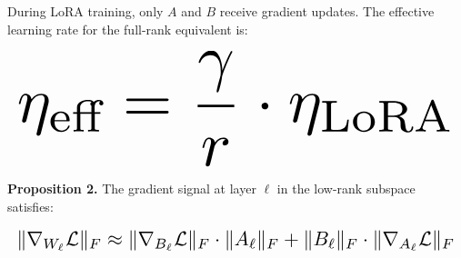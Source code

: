 \documentclass[10pt,journal,compsoc,twocolumn]{IEEEtran}
\begin{document}
During LoRA training, only $A$ and $B$ receive gradient updates. The effective learning rate for the full-rank equivalent is:

























\begin{equation}
\resizebox{\columnwidth}{!}{$\displaystyle
\begin{aligned}
\eta_{\text{eff}} = \frac{\gamma}{r} \cdot \eta_{\text{LoRA}}
\end{aligned}
$}
\end{equation}

























\textbf{Proposition 2.} The gradient signal at layer $\ell$ in the low-rank subspace satisfies:

























\begin{equation}
\resizebox{\columnwidth}{!}{$\displaystyle
\begin{aligned}
\|\nabla_{W_\ell}\mathcal{L}\|_F \approx \|\nabla_{B_\ell}\mathcal{L}\|_F \cdot \|A_\ell\|_F + \|B_\ell\|_F \cdot \|\nabla_{A_\ell}\mathcal{L}\|_F
\end{aligned}
$}
\end{equation}
\end{document}
